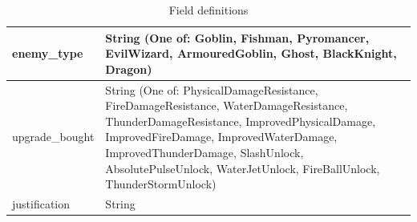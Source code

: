 \documentclass[11pt]{article}
\begin{document}
\begin{table}[H]
\begin{center}
\begin{tabularx}{\textwidth}{
        | >{\centering\arraybackslash\hsize=0.25\hsize}X
      | >{\centering\arraybackslash\hsize=0.75\hsize}X |}
      \hline
      enemy\_type & String (One of: Goblin, Fishman, Pyromancer, EvilWizard, ArmouredGoblin, Ghost, BlackKnight, Dragon)\\
      \hline
      upgrade\_bought & String (One of: PhysicalDamageResistance, FireDamageResistance, WaterDamageResistance, ThunderDamageResistance, ImprovedPhysicalDamage, ImprovedFireDamage, ImprovedWaterDamage, ImprovedThunderDamage, SlashUnlock, AbsolutePulseUnlock, WaterJetUnlock, FireBallUnlock, ThunderStormUnlock) \\
      \hline
      justification & String \\
      \hline
    \end{tabularx}
    \caption{Field definitions}
    \label{tab:field_definitions}
  \end{center}
\end{table}
\end{document}
